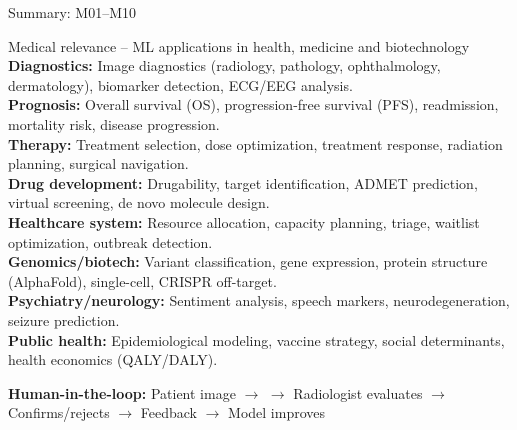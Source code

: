 \documentclass[aspectratio=169, 10pt]{beamer}
\begin{document}
\begin{frame}{Summary: M01--M10}
    \vspace{0mm}
    \begin{block}{\scriptsize Medical relevance -- ML applications in health, medicine and biotechnology}
        \scriptsize
        \textbf{Diagnostics:} Image diagnostics (radiology, pathology, ophthalmology, dermatology), biomarker detection, ECG/EEG analysis.\\
        \textbf{Prognosis:} Overall survival (OS), progression-free survival (PFS), readmission, mortality risk, disease progression.\\
        \textbf{Therapy:} Treatment selection, dose optimization, treatment response, radiation planning, surgical navigation.\\
        \textbf{Drug development:} Drugability, target identification, ADMET prediction, virtual screening, de novo molecule design.\\
        \textbf{Healthcare system:} Resource allocation, capacity planning, triage, waitlist optimization, outbreak detection.\\
        \textbf{Genomics/biotech:} Variant classification, gene expression, protein structure (AlphaFold), single-cell, CRISPR off-target.\\
        \textbf{Psychiatry/neurology:} Sentiment analysis, speech markers, neurodegeneration, seizure prediction.\\
        \textbf{Public health:} Epidemiological modeling, vaccine strategy, social determinants, health economics (QALY/DALY).
    \end{block}
    
    \vspace{-1mm}
    \begin{center}
    \tiny\textbf{Human-in-the-loop:} Patient image $\rightarrow$  $\rightarrow$ Radiologist evaluates $\rightarrow$ Confirms/rejects $\rightarrow$ Feedback $\rightarrow$ Model improves
    \end{center}

\end{frame}
\end{document}

